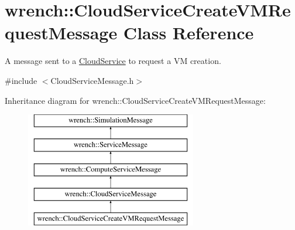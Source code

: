 \hypertarget{classwrench_1_1_cloud_service_create_v_m_request_message}{}\section{wrench\+:\+:Cloud\+Service\+Create\+V\+M\+Request\+Message Class Reference}
\label{classwrench_1_1_cloud_service_create_v_m_request_message}


A message sent to a \hyperlink{classwrench_1_1_cloud_service}{Cloud\+Service} to request a VM creation.  




{\ttfamily \#include $<$Cloud\+Service\+Message.\+h$>$}

Inheritance diagram for wrench\+:\+:Cloud\+Service\+Create\+V\+M\+Request\+Message\+:\begin{figure}[H]
\begin{center}
\leavevmode
\includegraphics[height=5.000000cm]{classwrench_1_1_cloud_service_create_v_m_request_message}
\end{center}
\end{figure}
